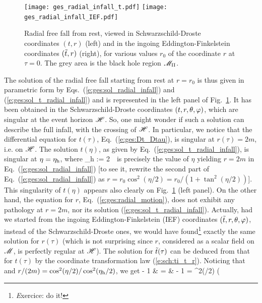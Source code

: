 \begin{figure}
\centerline{\texttt{[image: ges\_radial\_infall\_t.pdf]}\qquad\qquad
\texttt{[image: ges\_radial\_infall\_IEF.pdf]}}
\caption[]{\label{f:ges:radial_infall} \footnotesize
Radial free fall from rest, viewed in Schwarzschild-Droste coordinates $(t,r)$
(left) and in the ingoing Eddington-Finkelstein coordinates $({\tilde t},r)$ (right),
for various values $r_0$ of the coordinate $r$ at $\tau=0$. The grey area is the
black hole region $\mathscr{M}_{\rm II}$.}
\end{figure}


The solution of the radial free fall starting from rest at $r=r_0$ is
thus given in parametric form by Eqs.~(\ref{e:ges:sol_radial_infall}) and
(\ref{e:ges:sol_t_radial_infall}) and is represented in the left panel
of Fig.~\ref{f:ges:radial_infall}. It has been obtained in the Schwarzschild-Droste coordinates
$(t,r,\theta,\varphi)$, which are singular at the event horizon $\mathscr{H}$. So, one might wonder
if such a solution can describe the full infall, with the crossing of $\mathscr{H}$.
In particular, we notice that the differential equation for $t(\tau)$,
Eq.~(\ref{e:ges:Dt_Dtau}), is singular at $r(\tau)=2m$, i.e. on $\mathscr{H}$. The solution
$t(\eta)$, as given by Eq.~(\ref{e:ges:sol_t_radial_infall}), is singular at
$\eta=\eta_{\rm h}$, where
\be \label{e:ges:def_eta_star}
    \eta_{\rm h} := 2 \,\, 
\ee
is precisely the value of $\eta$ yielding $r=2m$ in Eq.~(\ref{e:ges:sol_radial_infall})
[to see it, rewrite the second part of Eq.~(\ref{e:ges:sol_radial_infall}) as
$r=r_0\cos^2(\eta/2) = r_0/(1+\tan^2(\eta/2))$].
This singularity of $t(\eta)$ appears also clearly on Fig.~\ref{f:ges:radial_infall} (left panel).
On the other hand, the equation
for $r$, Eq.~(\ref{e:ges:radial_motion}), does not exhibit any pathology
at $r=2m$, nor its solution (\ref{e:ges:sol_t_radial_infall}).
Actually, had we started from the ingoing Eddington-Finkelstein (IEF) coordinates
$({\tilde t},r,\theta,\varphi)$, instead of the Schwarzschild-Droste ones, we would have
found\footnote{{\emph Exercice:} do it!}
exactly the same solution for $r(\tau)$ (which is not surprising since
$r$, considered as a scalar field on $\mathscr{M}$, is perfectly regular at $\mathscr{H}$).
The solution for ${\tilde t}(\tau)$ can be deduced from that for $t(\tau)$ by
the coordinate transformation law (\ref{e:sch:ti_t_r}). Noticing that and
$r/(2m) = \cos^2(\eta/2)/\cos^2(\eta_{\rm h}/2)$, we get
\bea
     - 1 & = &  - 1
        = \cos^2(\eta/2) \left( 
